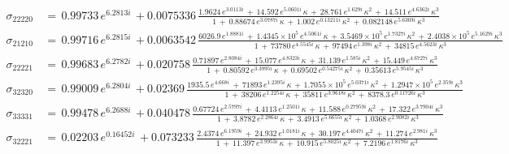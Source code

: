 \begin{align}
  \label{eq:ys22220}
  \sigma_{22220} \, &= \, 0.99733\,e^{6.2813i} \, + 0.0075336 \, \frac{ 1.9624\,e^{3.0113i} \, + \, 14.592\,e^{5.0601i}\,\kappa \, + \, 28.761\,e^{1.629i}\,{\kappa}^{2} \, + \, 14.511\,e^{4.6362i}\,{\kappa}^{3} }{ 1 \, + \,   0.88674\,e^{3.0787i}\,\kappa \, + \, 1.002\,e^{0.13211i}\,{\kappa}^{2} \, + \, 0.082148\,e^{5.6369i}\,{\kappa}^{3} }   \\
  \label{eq:ys21210}
  \sigma_{21210} \, &= \, 0.99716\,e^{6.2815i} \, + 0.0063542 \, \frac{ 6026.9\,e^{1.8881i}  \, + \, 1.4345\times 10^5\,e^{4.5061i}\,\kappa \, + \, 3.5469\times 10^5\,e^{1.7327i}\,{\kappa}^{2} \, + \, 2.4038\times 10^5\,e^{5.1629i}\,{\kappa}^{3} }{ 1 \, + \,   73780\,e^{4.5545i}\,\kappa \, + \, 97494\,e^{1.398i}\,{\kappa}^{2} \, + \, 34815\,e^{4.5623i}\,{\kappa}^{3} }   \\
  \label{eq:ys22221}
  \sigma_{22221} \, &= \, 0.99683\,e^{6.2782i} \, + 0.020758 \, \frac{  0.71897\,e^{2.8084i}  \, + \,  15.077\,e^{4.8323i}\,\kappa \, + \, 31.139\,e^{1.585i}\,{\kappa}^{2} \, + \, 15.449\,e^{4.6727i}\,{\kappa}^{3} }{ 1 \, + \,   0.80592\,e^{3.3995i}\,\kappa \, + \, 0.69502\,e^{0.54275i}\,{\kappa}^{2} \, + \, 0.35613\,e^{5.9545i}\,{\kappa}^{3} }   \\
  \label{eq:ys32320}
  \sigma_{32320} \, &= \, 0.99009\,e^{6.2804i} \, + 0.02369 \, \frac{  1935.5\,e^{4.668i} \, + \,  71893\,e^{1.2395i}\,\kappa \, + \, 1.7055\times 10^5\,e^{5.0371i}\,{\kappa}^{2} \, + \, 1.2947\times 10^5\,e^{2.359i}\,{\kappa}^{3} }{ 1 \, + \,   38206\,e^{1.2254i}\,\kappa \, + \, 35811\,e^{3.9618i}\,{\kappa}^{2} \, + \, 8378.3\,e^{0.11726i}\,{\kappa}^{3} }   \\
  \label{eq:ys33331}
  \sigma_{33331} \, &= \, 0.99478\,e^{6.2688i} \, + 0.040478 \, \frac{ 0.67724\,e^{2.5797i}  \, + \,   4.4113\,e^{1.2501i}\,\kappa \, + \, 11.588\,e^{0.27959i}\,{\kappa}^{2} \, + \, 17.322\,e^{3.7904i}\,{\kappa}^{3} }{ 1 \, + \,   3.8782\,e^{2.2864i}\,\kappa \, + \, 3.4913\,e^{5.6655i}\,{\kappa}^{2} \, + \, 1.0368\,e^{2.9082i}\,{\kappa}^{3} }   \\
  \label{eq:ys32221}
  \sigma_{32221} \, &= \, 0.02203\,e^{0.16452i} \, + 0.073233 \, \frac{ 2.4374\,e^{6.1959i}  \, + \,   24.932\,e^{1.0181i}\,\kappa \, + \, 30.197\,e^{4.4047i}\,{\kappa}^{2} \, + \, 11.274\,e^{2.981i}\,{\kappa}^{3} }{ 1 \, + \,   11.397\,e^{3.9953i}\,\kappa \, + \, 10.915\,e^{5.8025i}\,{\kappa}^{2} \, + \, 7.2196\,e^{1.8176i}\,{\kappa}^{3} }   \\

\end{align}
